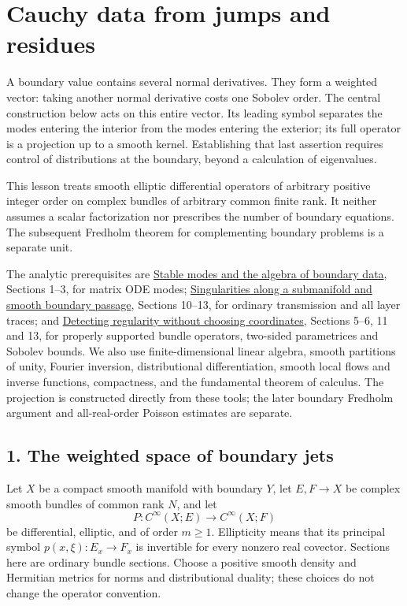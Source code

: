 \documentclass[
  11pt,
]{article}
\author{}
\date{}
\begin{document}
\section{Cauchy data from jumps and
residues}\label{cauchy-data-from-jumps-and-residues}

A boundary value contains several normal derivatives. They form a
weighted vector: taking another normal derivative costs one Sobolev
order. The central construction below acts on this entire vector. Its
leading symbol separates the modes entering the interior from the modes
entering the exterior; its full operator is a projection up to a smooth
kernel. Establishing that last assertion requires control of
distributions at the boundary, beyond a calculation of eigenvalues.

This lesson treats smooth elliptic differential operators of arbitrary
positive integer order on complex bundles of arbitrary common finite
rank. It neither assumes a scalar factorization nor prescribes the
number of boundary equations. The subsequent Fredholm theorem for
complementing boundary problems is a separate unit.

The analytic prerequisites are \href{stable-boundary-models.pdf}{Stable
modes and the algebra of boundary data}, Sections 1--3, for matrix ODE
modes; \href{conormal-transmission.pdf}{Singularities along a submanifold
and smooth boundary passage}, Sections 10--13, for ordinary transmission
and all layer traces; and
\href{geometric-microlocal-calculus.pdf}{Detecting regularity without
choosing coordinates}, Sections 5--6, 11 and 13, for properly supported
bundle operators, two-sided parametrices and Sobolev bounds. We also use
finite-dimensional linear algebra, smooth partitions of unity, Fourier
inversion, distributional differentiation, smooth local flows and
inverse functions, compactness, and the fundamental theorem of calculus.
The projection is constructed directly from these tools; the later
boundary Fredholm argument and all-real-order Poisson estimates are
separate.

\subsection{1. The weighted space of boundary
jets}\label{the-weighted-space-of-boundary-jets}

Let \(X\) be a compact smooth manifold with boundary \(Y\), let
\(E,F\to X\) be complex smooth bundles of common rank \(N\), and let \[
P:C^\infty(X;E)\longrightarrow C^\infty(X;F)
\tag{CD1}
\] be differential, elliptic, and of order \(m\geq1\). Ellipticity means
that its principal symbol \(p(x,\xi):E_x\to F_x\) is invertible for
every nonzero real covector. Sections here are ordinary bundle sections.
Choose a positive smooth density and Hermitian metrics for norms and
distributional duality; these choices do not change the operator
convention.
\end{document}
